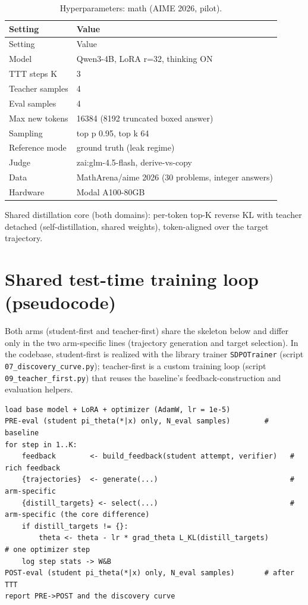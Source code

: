 \begin{longtable}{ll}
\caption{Hyperparameters: math (AIME 2026, pilot).}\\
\toprule
Setting & Value \\
\midrule
\endfirsthead
\toprule
Setting & Value \\
\midrule
\endhead
\bottomrule
\endfoot
Model & Qwen3-4B, LoRA r=32, thinking ON \\
TTT steps K & 3 \\
Teacher samples & 4 \\
Eval samples & 4 \\
Max new tokens & 16384 (8192 truncated boxed answer) \\
Sampling & top p 0.95, top k 64 \\
Reference mode & ground truth (leak regime) \\
Judge & zai:glm-4.5-flash, derive-vs-copy \\
Data & MathArena/aime 2026 (30 problems, integer answers) \\
Hardware & Modal A100-80GB \\
\end{longtable}

Shared distillation core (both domains): per-token top-K reverse KL with teacher detached (self-distillation, shared weights), token-aligned over the target trajectory.

\section{Shared test-time training loop (pseudocode)}\label{a.3-shared-ttt-loop}

{\sloppy Both arms (student-first and teacher-first) share the skeleton below and differ only in the two arm-specific lines (trajectory generation and target selection). In the codebase, student-first is realized with the library trainer \texttt{SDPOTrainer} (script \texttt{07\_discovery\_curve.py}); teacher-first is a custom training loop (script \texttt{09\_teacher\_first.py}) that reuses the baseline's feedback-construction and evaluation helpers.\par}

\begin{lstlisting}
load base model + LoRA + optimizer (AdamW, lr = 1e-5)
PRE-eval (student pi_theta(*|x) only, N_eval samples)        # baseline
for step in 1..K:
    feedback        <- build_feedback(student attempt, verifier)   # rich feedback
    {trajectories}  <- generate(...)                               # arm-specific
    {distill_targets} <- select(...)                               # arm-specific (the core difference)
    if distill_targets != {}:
        theta <- theta - lr * grad_theta L_KL(distill_targets)                    # one optimizer step
    log step stats -> W&B
POST-eval (student pi_theta(*|x) only, N_eval samples)       # after TTT
report PRE->POST and the discovery curve
\end{lstlisting}

